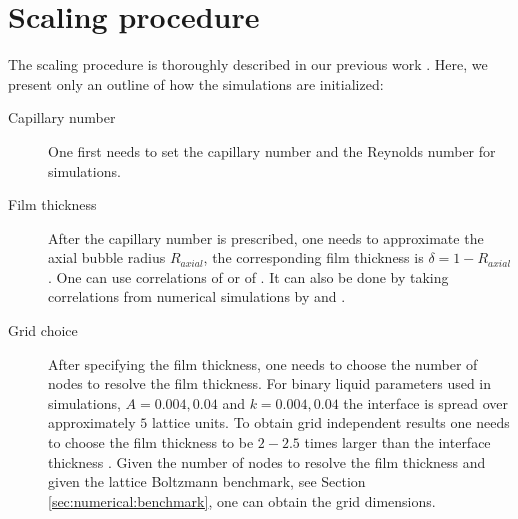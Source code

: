 \documentclass{article}
\begin{document}
\section{Scaling procedure}
\label{append:scaling}
The scaling procedure is thoroughly described in our previous work \cite{kuzmin-binary2d}. Here, we present
only an outline of how the simulations are initialized:
\begin{description}
 \item[Capillary number] One first needs to set the capillary number and the Reynolds number for
simulations. 
 \item[Film thickness] After the capillary number is prescribed, one needs to approximate the axial
bubble radius $R_{axial}$, the corresponding film thickness is $\delta=1-R_{axial}$. One can use
correlations of \citet{shikazono-square} or of \citet{kreutzer-taylor}. It can also be done by
taking correlations from numerical simulations by
\citet{heil-bretherton} and \citet{giavedoni-numerical}.  
\item[Grid choice] After specifying the film thickness, one needs to choose the
number of nodes to resolve the film thickness. For binary liquid parameters used in simulations,
$A=0.004,0.04$ and $k=0.004,0.04$ the
interface is spread over approximately $5$ lattice units. To obtain grid independent results one
needs to choose the
film thickness to be $2-2.5$ times larger than the interface thickness \cite{kuzmin-binary2d}.
Given the number of nodes to resolve the film thickness and given the lattice Boltzmann
benchmark, see Section \ref{sec:numerical:benchmark}, one can obtain the grid dimensions.


\end{description}
\end{document}

